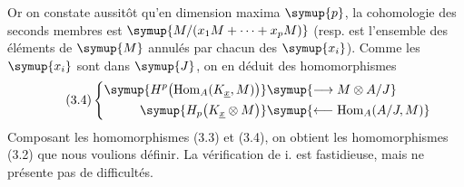 Or on constate aussitôt qu'en dimension maxima $\symup{p}$, la cohomologie des seconds
membres est $\symup{M/(x_1M+\cdots+x_pM)}$ (resp. est l'ensemble des éléments de $\symup{M}$
annulés par chacun des $\symup{x_i}$). Comme les $\symup{x_i}$ sont dans $\symup{J}$, on en déduit des
homomorphismes
\begin{equation}\tag{3.4}
\left\{
\begin{aligned}\symup{H^{p}\bigl(\operatorname{Hom}_{A}(K_{\underline{x}},M)\bigr)}&\symup{\longrightarrow M\otimes A/J}\\\symup{H_{p}\bigl(K_{\underline{x}}\otimes M\bigr)}&\symup{\longleftarrow\operatorname{Hom}_{A}(A/J,M)}\end{aligned}
\right.
\end{equation}
Composant les homomorphismes (3.3) et (3.4), on obtient les homomorphismes (3.2)
que nous voulions définir. La vérification de i. est fastidieuse, mais ne
présente pas de difficultés.

